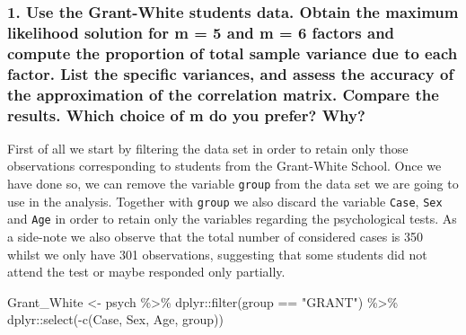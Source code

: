 \documentclass[
  letterpaper,
  DIV=11,
  numbers=noendperiod]{scrartcl}
\newenvironment{Shaded}{\begin{snugshade}}{\end{snugshade}}
\newcommand{\FunctionTok}[1]{\textcolor[rgb]{0.28,0.35,0.67}{#1}}
\newcommand{\NormalTok}[1]{\textcolor[rgb]{0.00,0.23,0.31}{#1}}
\newcommand{\OtherTok}[1]{\textcolor[rgb]{0.00,0.23,0.31}{#1}}
\newcommand{\SpecialCharTok}[1]{\textcolor[rgb]{0.37,0.37,0.37}{#1}}
\newcommand{\StringTok}[1]{\textcolor[rgb]{0.13,0.47,0.30}{#1}}
\begin{document}
\hypertarget{use-the-grant-white-students-data.-obtain-the-maximum-likelihood-solution-for-m-5-and-m-6-factors-and-compute-the-proportion-of-total-sample-variance-due-to-each-factor.-list-the-specific-variances-and-assess-the-accuracy-of-the-approximation-of-the-correlation-matrix.-compare-the-results.-which-choice-of-m-do-you-prefer-why}{%
\subsubsection{1. Use the Grant-White students data. Obtain the maximum
likelihood solution for m = 5 and m = 6 factors and compute the
proportion of total sample variance due to each factor. List the
specific variances, and assess the accuracy of the approximation of the
correlation matrix. Compare the results. Which choice of m do you
prefer?
Why?}\label{use-the-grant-white-students-data.-obtain-the-maximum-likelihood-solution-for-m-5-and-m-6-factors-and-compute-the-proportion-of-total-sample-variance-due-to-each-factor.-list-the-specific-variances-and-assess-the-accuracy-of-the-approximation-of-the-correlation-matrix.-compare-the-results.-which-choice-of-m-do-you-prefer-why}}

First of all we start by filtering the data set in order to retain only
those observations corresponding to students from the Grant-White
School. Once we have done so, we can remove the variable \texttt{group}
from the data set we are going to use in the analysis. Together with
\texttt{group} we also discard the variable \texttt{Case}, \texttt{Sex}
and \texttt{Age} in order to retain only the variables regarding the
psychological tests. As a side-note we also observe that the total
number of considered cases is 350 whilst we only have 301 observations,
suggesting that some students did not attend the test or maybe responded
only partially.

\begin{Shaded}
\begin{Highlighting}[]
\NormalTok{Grant\_White }\OtherTok{\textless{}{-}}\NormalTok{ psych }\SpecialCharTok{\%\textgreater{}\%}\NormalTok{ dplyr}\SpecialCharTok{::}\FunctionTok{filter}\NormalTok{(group }\SpecialCharTok{==} \StringTok{"GRANT"}\NormalTok{) }\SpecialCharTok{\%\textgreater{}\%}
\NormalTok{dplyr}\SpecialCharTok{::}\FunctionTok{select}\NormalTok{(}\SpecialCharTok{{-}}\FunctionTok{c}\NormalTok{(Case, Sex, Age, group))}
\end{Highlighting}
\end{Shaded}
\end{document}
